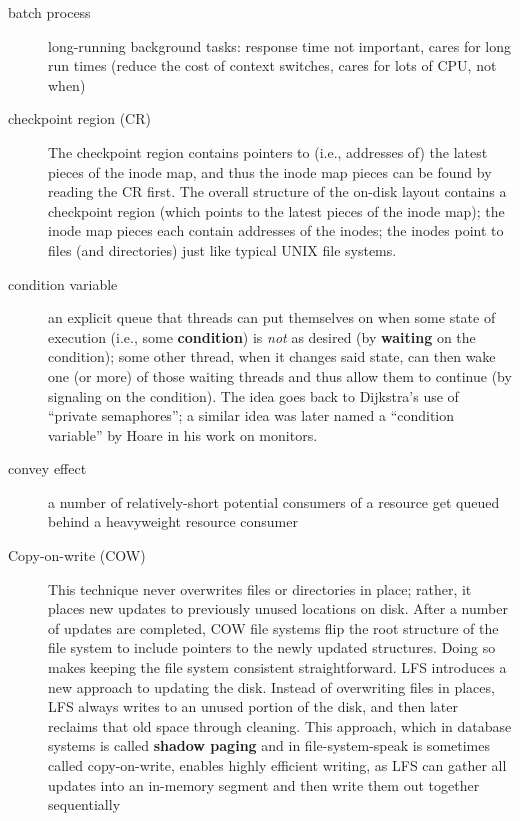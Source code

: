 \begin{description}
\item[batch process] long-running background tasks: response time not important, cares for long run times (reduce the cost of context switches, cares for lots of CPU, not when)

\item[checkpoint region (CR)] The checkpoint region contains pointers to (i.e., addresses of) the latest pieces of the inode map, and thus the inode map pieces can be found by reading the CR first. The overall structure of the on-disk layout contains a checkpoint region (which points to the latest pieces of the inode map); the inode map pieces each contain addresses of the inodes; the inodes point to files (and directories) just like typical UNIX file systems.

\item[condition variable] an explicit queue that threads can put themselves on when some state of execution (i.e., some \textbf{condition}) is \emph{not} as desired (by \textbf{waiting} on the condition); some other thread, when it changes said state, can then wake one (or more) of those waiting threads and thus allow them to continue (by signaling on the condition). The idea goes back to Dijkstra's use of ``private semaphores''; a similar idea was later named a ``condition variable'' by Hoare in his work on monitors.

\item[convey effect] a number of relatively-short potential consumers of a resource get queued behind a heavyweight resource consumer

\item[Copy-on-write (COW)] This technique never overwrites files or directories in place; rather, it places new updates to previously unused locations on disk. After a number of updates are completed, COW file systems flip the root structure of the file system to include pointers to the newly updated structures. Doing so makes keeping the file system consistent straightforward.  LFS introduces a new approach to updating the disk. Instead of overwriting files in places, LFS always writes to an unused portion of the disk, and then later reclaims that old space through cleaning. This approach, which in database systems is called \textbf{shadow paging} and in file-system-speak is sometimes called copy-on-write, enables highly efficient writing, as LFS can gather all updates into an in-memory segment and then write them out together sequentially


\end{description}
